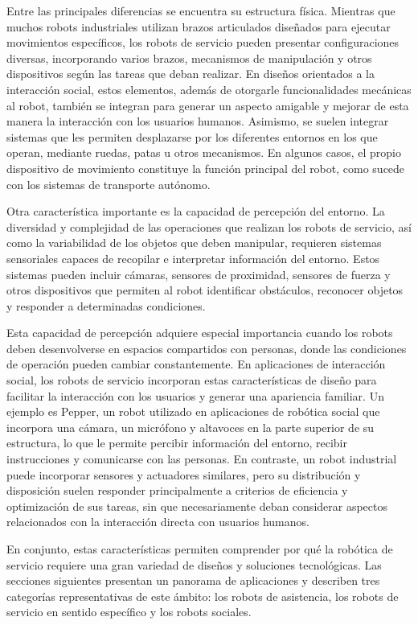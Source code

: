\documentclass[11pt,a4paper]{article}
\begin{document}
Entre las principales diferencias se encuentra su estructura física. Mientras que muchos robots industriales utilizan brazos articulados diseñados para ejecutar movimientos específicos, los robots de servicio pueden presentar configuraciones diversas, incorporando varios brazos, mecanismos de manipulación y otros dispositivos según las tareas que deban realizar. En diseños orientados a la interacción social, estos elementos, además de otorgarle funcionalidades mecánicas al robot, también se integran para generar un aspecto amigable y mejorar de esta manera la interacción con los usuarios humanos. Asimismo, se suelen integrar sistemas que les permiten desplazarse por los diferentes entornos en los que operan, mediante ruedas, patas u otros mecanismos. En algunos casos, el propio dispositivo de movimiento constituye la función principal del robot, como sucede con los sistemas de transporte autónomo.\cite{aracil}

Otra característica importante es la capacidad de percepción del entorno. La diversidad y complejidad de las operaciones que realizan los robots de servicio, así como la variabilidad de los objetos que deben manipular, requieren sistemas sensoriales capaces de recopilar e interpretar información del entorno. Estos sistemas pueden incluir cámaras, sensores de proximidad, sensores de fuerza y otros dispositivos que permiten al robot identificar obstáculos, reconocer objetos y responder a determinadas condiciones.

Esta capacidad de percepción adquiere especial importancia cuando los robots deben desenvolverse en espacios compartidos con personas, donde las condiciones de operación pueden cambiar constantemente. En aplicaciones de interacción social, los robots de servicio incorporan estas características de diseño para facilitar la interacción con los usuarios y generar una apariencia familiar. Un ejemplo es Pepper, un robot utilizado en aplicaciones de robótica social que incorpora una cámara, un micrófono y altavoces en la parte superior de su estructura, lo que le permite percibir información del entorno, recibir instrucciones y comunicarse con las personas.\cite{pepperdoc} En contraste, un robot industrial puede incorporar sensores y actuadores similares, pero su distribución y disposición suelen responder principalmente a criterios de eficiencia y optimización de sus tareas, sin que necesariamente deban considerar aspectos relacionados con la interacción directa con usuarios humanos.

En conjunto, estas características permiten comprender por qué la robótica de servicio requiere una gran variedad de diseños y soluciones tecnológicas. Las secciones siguientes presentan un panorama de aplicaciones y describen tres categorías representativas de este ámbito: los robots de asistencia, los robots de servicio en sentido específico y los robots sociales.
\end{document}
